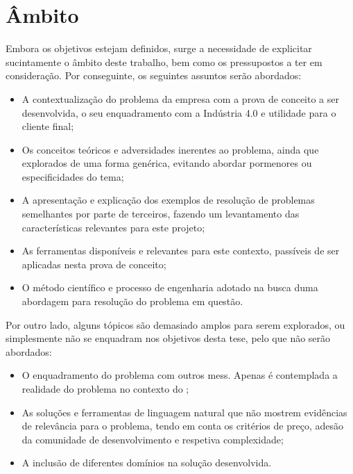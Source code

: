 \section{Âmbito}
\label{sec:chap01_scope}
Embora os objetivos estejam definidos, surge a necessidade de explicitar sucintamente o âmbito deste trabalho, bem como os pressupostos a ter em consideração. Por conseguinte, os seguintes assuntos serão abordados:

\begin{itemize}
    \item
    {
        A contextualização do problema da empresa com a prova de conceito a ser desenvolvida, o seu enquadramento com a Indústria 4.0 e utilidade para o cliente final; 
    }
    \item 
    {
        Os conceitos teóricos e adversidades inerentes ao problema, ainda que explorados de uma forma genérica, evitando abordar pormenores ou especificidades do tema;
    }
    \item
    {
        A apresentação e explicação dos exemplos de resolução de problemas semelhantes por parte de terceiros, fazendo um levantamento das características relevantes para este projeto;
    }
    \item
    {
        As ferramentas disponíveis e relevantes para este contexto, passíveis de ser aplicadas nesta prova de conceito;
    }
    \item
    {
        O método científico e processo de engenharia adotado na busca duma abordagem para resolução do problema em questão.
    }
\end{itemize}

Por outro lado, alguns tópicos são demasiado amplos para serem explorados, ou simplesmente não se enquadram nos objetivos desta tese, pelo que não serão abordados:

\begin{itemize}
    \item
    {
        O enquadramento do problema com outros \glspl{mes}. Apenas é contemplada a realidade do problema no contexto do {\productname};
    }
    \item
    {
        As soluções e ferramentas de linguagem natural que não mostrem evidências de relevância para o problema, tendo em conta os critérios de preço, adesão da comunidade de desenvolvimento e respetiva complexidade;
    }
    \item 
    {
        A inclusão de diferentes domínios na solução desenvolvida.
    }
\end{itemize}

